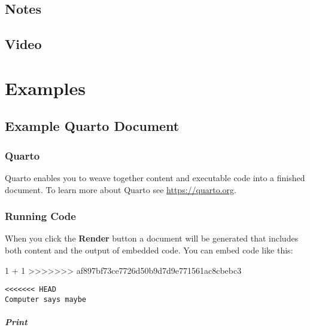 \documentclass[
  letterpaper,
  DIV=11,
  numbers=noendperiod]{scrreprt}
\newenvironment{Shaded}{\begin{snugshade}}{\end{snugshade}}
\newcommand{\DecValTok}[1]{\textcolor[rgb]{0.68,0.00,0.00}{#1}}
\newcommand{\OperatorTok}[1]{\textcolor[rgb]{0.37,0.37,0.37}{#1}}
\newcommand{\OperatorTok}[1]{\textcolor[rgb]{0.37,0.37,0.37}{#1}}
\begin{document}
\begin{Shaded}
\begin{Highlighting}[]
\hypertarget{notes-4}{%
\chapter{Notes}\label{notes-4}}

\hypertarget{video-2}{%
\chapter{Video}\label{video-2}}

\part{Examples}

\hypertarget{example-quarto-document}{%
\chapter{Example Quarto Document}\label{example-quarto-document}}

\hypertarget{quarto}{%
\section{Quarto}\label{quarto}}

Quarto enables you to weave together content and executable code into a
finished document. To learn more about Quarto see
\url{https://quarto.org}.

\hypertarget{running-code}{%
\section{Running Code}\label{running-code}}

When you click the \textbf{Render} button a document will be generated
that includes both content and the output of embedded code. You can
embed code like this:

\begin{Shaded}
\begin{Highlighting}[]
\DecValTok{1} \OperatorTok{+} \DecValTok{1}
>>>>>>> af897bf73ce7726d50b9d7d9e771561ac8cbebc3
\end{Highlighting}
\end{Shaded}

\begin{verbatim}
<<<<<<< HEAD
Computer says maybe
\end{verbatim}

\hypertarget{print}{%
\subsubsection{Print}\label{print}}


\end{Highlighting}
\end{Shaded}
\end{document}
